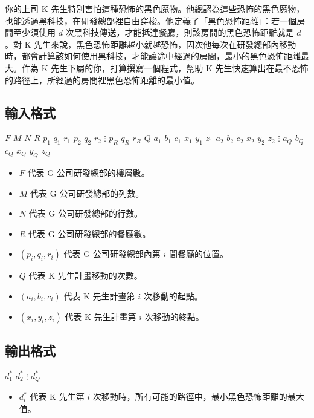 你的上司 K
先生特別害怕這種恐怖的黑色魔物。他總認為這些恐怖的黑色魔物，也能透過黑科技，在研發總部裡自由穿梭。他定義了「黑色恐怖距離」：若一個房間至少須使用
\(d\) 次黑科技傳送，才能抵達餐廳，則該房間的黑色恐怖距離就是 \(d\)。對 K
先生來說，黑色恐怖距離越小就越恐怖，因次他每次在研發總部內移動時，都會計算該如何使用黑科技，才能讓途中經過的房間，最小的黑色恐怖距離最大。作為
K 先生下屬的你，打算撰寫一個程式，幫助 K
先生快速算出在最不恐怖的路徑上，所經過的房間裡黑色恐怖距離的最小值。

\subsection{輸入格式}

\begin{format}
\f{
$F$ $M$ $N$
$R$
$p_1$ $q_1$ $r_1$
$p_2$ $q_2$ $r_2$
$\vdots$
$p_R$ $q_R$ $r_R$
$Q$
$a_1$ $b_1$ $c_1$ $x_1$ $y_1$ $z_1$
$a_2$ $b_2$ $c_2$ $x_2$ $y_2$ $z_2$
$\vdots$
$a_Q$ $b_Q$ $c_Q$ $x_Q$ $y_Q$ $z_Q$
}
\end{format}

\begin{itemize}
\tightlist
\item
  \(F\) 代表 G 公司研發總部的樓層數。
\item
  \(M\) 代表 G 公司研發總部的列數。
\item
  \(N\) 代表 G 公司研發總部的行數。
\item
  \(R\) 代表 G 公司研發總部的餐廳數。
\item
  \((p_i, q_i, r_i)\) 代表 G 公司研發總部內第 \(i\) 間餐廳的位置。
\item
  \(Q\) 代表 K 先生計畫移動的次數。
\item
  \((a_i, b_i, c_i)\) 代表 K 先生計畫第 \(i\) 次移動的起點。
\item
  \((x_i, y_i, z_i)\) 代表 K 先生計畫第 \(i\) 次移動的終點。
\end{itemize}

\subsection{輸出格式}

\begin{format}
\f{
$d_1^*$
$d_2^*$
$\vdots$
$d_Q^*$
}
\end{format}

\begin{itemize}
\tightlist
\item
  \(d_i^*\) 代表 K 先生第 \(i\)
  次移動時，所有可能的路徑中，最小黑色恐怖距離的最大值。
\end{itemize}

